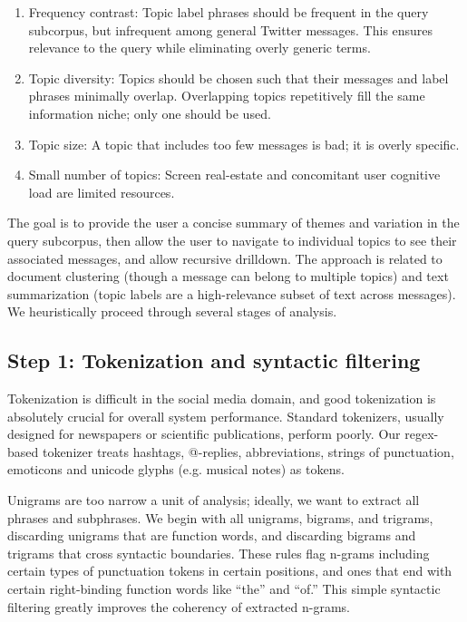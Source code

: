 \documentclass[letterpaper]{article}
\begin{document}
\begin{enumerate}
\item Frequency contrast: Topic label phrases should be frequent in the query subcorpus, but infrequent among general Twitter messages.  This ensures relevance to the query while eliminating overly generic terms.
\item Topic diversity: Topics should be chosen such that their messages and label phrases minimally overlap.  Overlapping topics repetitively fill the same information niche; only one should be used.
\item Topic size: A topic that includes too few messages is bad; it is overly specific.
\item Small number of topics: Screen real-estate and concomitant user cognitive load are limited resources.
\end{enumerate}
The goal is to provide the user a concise summary of themes and variation in the query subcorpus, then allow the user to navigate to individual topics to see their associated messages, and allow recursive drilldown.  The approach is related to document clustering (though a message can belong to multiple topics) and text summarization (topic labels are a high-relevance subset of text across messages).  We heuristically proceed through several stages of analysis.


\subsection{Step 1: Tokenization and syntactic filtering}

Tokenization is difficult in the social media domain, and good tokenization is absolutely crucial for overall system performance.  Standard tokenizers, usually designed for newspapers or scientific publications, perform poorly.  Our regex-based tokenizer treats hashtags, @-replies, abbreviations, strings of punctuation, emoticons and unicode glyphs (e.g. musical notes) as tokens.

Unigrams are too narrow a unit of analysis; ideally, we want to extract all phrases and subphrases.  We begin with all unigrams, bigrams, and trigrams, discarding unigrams that are function words, and discarding bigrams and trigrams that cross syntactic boundaries. These rules flag n-grams including certain types of punctuation tokens in certain positions, and ones that end with certain right-binding function words like ``the'' and ``of.''  This simple syntactic filtering greatly improves the coherency of extracted n-grams.
\end{document}
